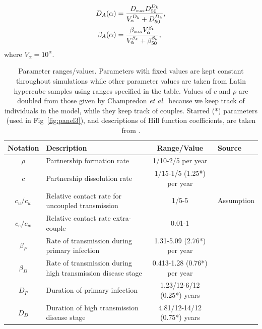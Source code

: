 \documentclass[10pt,letterpaper]{article}
\renewcommand{\figurename}{Fig}
\newcommand{\etal}{\textit{et al.}}
\newcommand{\tsub}[2]{#1_{{\textrm{\tiny #2}}}}
\begin{document}
\begin{equation}
\begin{split}
D_A(\alpha) &= \frac{\tsub{D}{max} D_{50} ^{D_k}}{V_\alpha ^{D_k} + D_{50}^{D_k}}, \\
\beta_A(\alpha) &= \frac{\tsub{\beta}{max} V_\alpha ^ {\beta_k}}%
{V_\alpha^{\beta_k} + \beta_{50} ^{\beta_k}},
\end{split}
\label{eq:hillfuns}
\end{equation}
where $V_{\alpha} = 10^\alpha$. 


\begin{table}[h!]
\caption{Parameter ranges/values. Parameters with fixed values are kept constant throughout simulations while other parameter values are taken from Latin hypercube samples using ranges specified in the table. Values of $c$ and $\rho$ are doubled from those given by Champredon \etal\ because we keep track of individuals in the model, while they keep track of couples. Starred (*) parameters (used in \figurename~\ref{fig:panel3}), and descriptions of Hill function coefficients, are taken from \cite{shirreff_transmission_2011}.}
\centering
\begin{tabular}{c p{2in} c l}
\hline 
Notation & Description & Range/Value & Source\\
\hline %
$\rho$ & Partnership formation rate & 1/10-2/5 per year & \cite{champredon_hiv_2013} \\
$c$ & Partnership dissolution rate & 1/15-1/5 (1.25*) per year & \cite{champredon_hiv_2013} \\
$c_u/c_w$ & Relative contact rate for uncoupled transmission & 1/5-5 & Assumption \\
$c_e/c_w$ & Relative contact rate extra-couple & 0.01-1 & \cite{champredon_hiv_2013} \\
$\beta_P$ & Rate of transmission during primary infection & 1.31-5.09 (2.76*) per year & \cite{hollingsworth_hiv1_2008} \\
$\beta_D$ & Rate of transmission during high transmission disease stage & 0.413-1.28 (0.76*) per year & \cite{hollingsworth_hiv1_2008} \\
$D_P$ & Duration of primary infection & 1.23/12-6/12 (0.25*) years & \cite{hollingsworth_hiv1_2008} \\
$D_D$ & Duration of high transmission disease stage & 4.81/12-14/12 (0.75*) years & \cite{hollingsworth_hiv1_2008} \\

\end{tabular}
\end{table}
\end{document}
